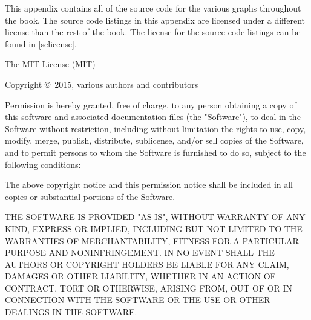 
This appendix contains all of the source code for the various graphs throughout
the book. The source code listings in this appendix are licensed under a
different license than the rest of the book. The license for the source code
listings can be found in \cref{sclicense}.





\label{sclicense}

The MIT License (MIT)

Copyright \copyright\ 2015, various authors and contributors

Permission is hereby granted, free of charge, to any person obtaining a copy of
this software and associated documentation files (the "Software"), to deal in
the Software without restriction, including without limitation the rights to
use, copy, modify, merge, publish, distribute, sublicense, and/or sell copies of
the Software, and to permit persons to whom the Software is furnished to do so,
subject to the following conditions:

The above copyright notice and this permission notice shall be included in all
copies or substantial portions of the Software.

THE SOFTWARE IS PROVIDED "AS IS", WITHOUT WARRANTY OF ANY KIND, EXPRESS OR
IMPLIED, INCLUDING BUT NOT LIMITED TO THE WARRANTIES OF MERCHANTABILITY, FITNESS
FOR A PARTICULAR PURPOSE AND NONINFRINGEMENT. IN NO EVENT SHALL THE AUTHORS OR
COPYRIGHT HOLDERS BE LIABLE FOR ANY CLAIM, DAMAGES OR OTHER LIABILITY, WHETHER
IN AN ACTION OF CONTRACT, TORT OR OTHERWISE, ARISING FROM, OUT OF OR IN
CONNECTION WITH THE SOFTWARE OR THE USE OR OTHER DEALINGS IN THE SOFTWARE.
